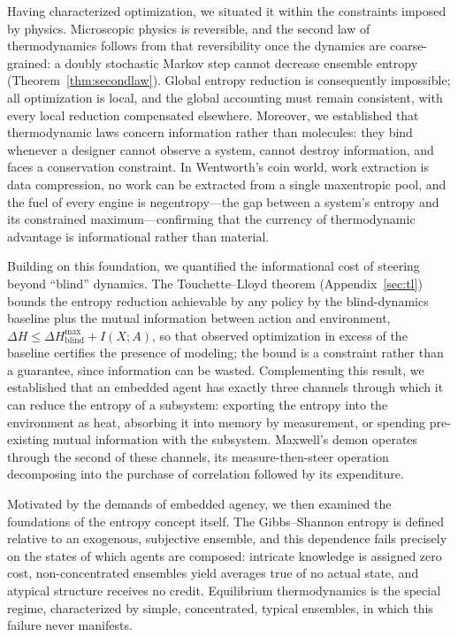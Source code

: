 \documentclass[11pt]{article}
\begin{document}
Having characterized optimization, we situated it within the constraints imposed by physics. Microscopic physics is reversible, and the second law of thermodynamics follows from that reversibility once the dynamics are coarse-grained: a doubly stochastic Markov step cannot decrease ensemble entropy (Theorem~\ref{thm:secondlaw}). Global entropy reduction is consequently impossible; all optimization is local, and the global accounting must remain consistent, with every local reduction compensated elsewhere. Moreover, we established that thermodynamic laws concern information rather than molecules: they bind whenever a designer cannot observe a system, cannot destroy information, and faces a conservation constraint. In Wentworth's coin world, work extraction is data compression, no work can be extracted from a single maxentropic pool, and the fuel of every engine is negentropy---the gap between a system's entropy and its constrained maximum---confirming that the currency of thermodynamic advantage is informational rather than material.

Building on this foundation, we quantified the informational cost of steering beyond ``blind'' dynamics. The Touchette--Lloyd theorem (Appendix~\ref{sec:tl}) bounds the entropy reduction achievable by any policy by the blind-dynamics baseline plus the mutual information between action and environment, $\Delta H \le \Delta H^{\max}_{\mathrm{blind}} + I(X;A)$, so that observed optimization in excess of the baseline certifies the presence of modeling; the bound is a constraint rather than a guarantee, since information can be wasted. Complementing this result, we established that an embedded agent has exactly three channels through which it can reduce the entropy of a subsystem: exporting the entropy into the environment as heat, absorbing it into memory by measurement, or spending pre-existing mutual information with the subsystem. Maxwell's demon operates through the second of these channels, its measure-then-steer operation decomposing into the purchase of correlation followed by its expenditure.

Motivated by the demands of embedded agency, we then examined the foundations of the entropy concept itself. The Gibbs--Shannon entropy is defined relative to an exogenous, subjective ensemble, and this dependence fails precisely on the states of which agents are composed: intricate knowledge is assigned zero cost, non-concentrated ensembles yield averages true of no actual state, and atypical structure receives no credit. Equilibrium thermodynamics is the special regime, characterized by simple, concentrated, typical ensembles, in which this failure never manifests.
\end{document}
